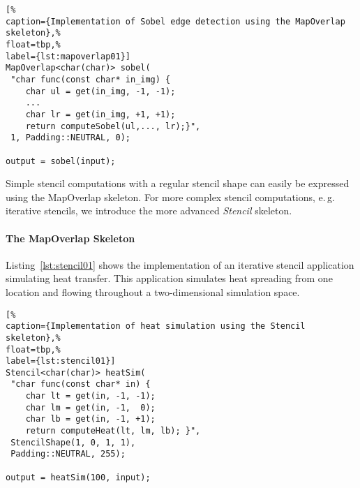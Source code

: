 \begin{lstlisting}[%
caption={Implementation of Sobel edge detection using the MapOverlap skeleton},%
float=tbp,%
label={lst:mapoverlap01}]
MapOverlap<char(char)> sobel(
 "char func(const char* in_img) {
    char ul = get(in_img, -1, -1);
    ...
    char lr = get(in_img, +1, +1);
    return computeSobel(ul,..., lr);}",
 1, Padding::NEUTRAL, 0);

output = sobel(input);
\end{lstlisting}

Simple stencil computations with a regular stencil shape can easily be expressed using the MapOverlap skeleton.
For more complex stencil computations, e.\,g. iterative stencils, we introduce the more advanced \emph{Stencil} skeleton.
\paragraph{The MapOverlap Skeleton}

Listing~\ref{lst:stencil01} shows the implementation of an iterative stencil application simulating heat transfer.
This application simulates heat spreading from one location and flowing throughout a two-dimensional simulation space.
\begin{lstlisting}[%
caption={Implementation of heat simulation using the Stencil skeleton},%
float=tbp,%
label={lst:stencil01}]
Stencil<char(char)> heatSim(
 "char func(const char* in) {
    char lt = get(in, -1, -1);
    char lm = get(in, -1,  0);
    char lb = get(in, -1, +1);
    return computeHeat(lt, lm, lb); }",
 StencilShape(1, 0, 1, 1),
 Padding::NEUTRAL, 255);

output = heatSim(100, input);
\end{lstlisting}


